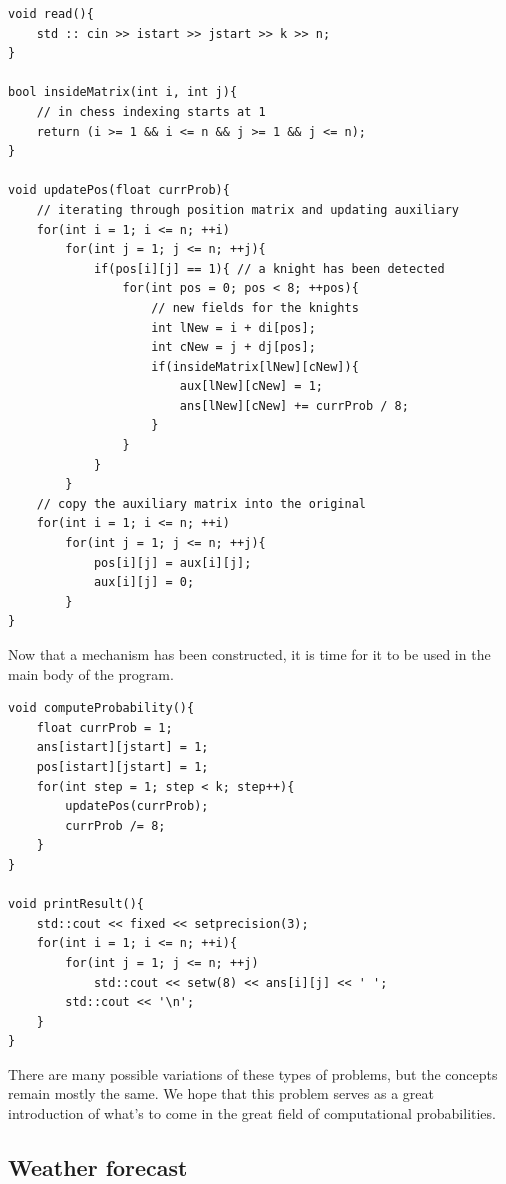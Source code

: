 \documentclass[letterpaper]{article}
\begin{document}
\begin{lstlisting}
void read(){
    std :: cin >> istart >> jstart >> k >> n;
}

bool insideMatrix(int i, int j){
    // in chess indexing starts at 1
    return (i >= 1 && i <= n && j >= 1 && j <= n);
}

void updatePos(float currProb){
    // iterating through position matrix and updating auxiliary
    for(int i = 1; i <= n; ++i)
        for(int j = 1; j <= n; ++j){
            if(pos[i][j] == 1){ // a knight has been detected
                for(int pos = 0; pos < 8; ++pos){
                    // new fields for the knights
                    int lNew = i + di[pos];
                    int cNew = j + dj[pos];
                    if(insideMatrix[lNew][cNew]){
                        aux[lNew][cNew] = 1;
                        ans[lNew][cNew] += currProb / 8;
                    }
                }
            }
        }
    // copy the auxiliary matrix into the original
    for(int i = 1; i <= n; ++i)
        for(int j = 1; j <= n; ++j){
            pos[i][j] = aux[i][j];
            aux[i][j] = 0;
        }
}
\end{lstlisting}

Now that a mechanism has been constructed, it is time for it to be used in the main body of the program.

\begin{lstlisting}
void computeProbability(){
    float currProb = 1;
    ans[istart][jstart] = 1;
    pos[istart][jstart] = 1;
    for(int step = 1; step < k; step++){
        updatePos(currProb);
        currProb /= 8;
    }
}

void printResult(){
    std::cout << fixed << setprecision(3);
    for(int i = 1; i <= n; ++i){
        for(int j = 1; j <= n; ++j)
            std::cout << setw(8) << ans[i][j] << ' ';
        std::cout << '\n';
    }
}
\end{lstlisting}

There are many possible variations of these types of problems, but the concepts remain mostly the same. We hope that this problem serves as a great introduction of what's to come in the great field of computational probabilities.

\newpage

\subsection{Weather forecast}

\newpage
\end{document}
